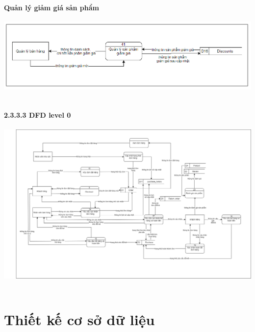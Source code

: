 \documentclass[12pt,a4paper,2sides]{report}
\begin{document}
\subsubsection{Quản lý giảm giá sản phẩm}
    \includegraphics[width=1\linewidth]{lib/DFD/quanlyspgiamgia.png}\\\vspace*{1cm} 
    \hspace{4cm}{Hình 32. Quản lý giảm giá sản phẩm}\\
 
\subsubsection{2.3.3.3 DFD level 0}
    \includegraphics[width=1\linewidth]{lib/DFD/level0.png}\\\vspace*{1cm} 
    \hspace{5cm}{Hình 33. DFD Level 0}\\
\chapter{Thiết kế cơ sở dữ liệu}
\end{document}
